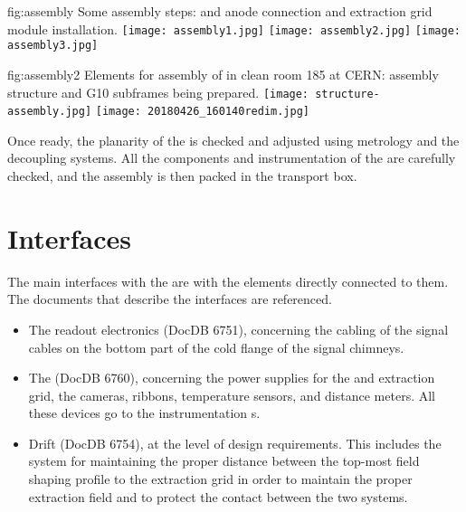 \begin{dunefigure}{fig:assembly}
{Some assembly steps:  and anode connection and extraction grid module installation.}
\texttt{[image: assembly1.jpg]}
\texttt{[image: assembly2.jpg]}
\texttt{[image: assembly3.jpg]}
\end{dunefigure}

\begin{dunefigure}{fig:assembly2}
{Elements for assembly of   in clean room 185 at CERN: assembly structure and G10 subframes being prepared.}
\texttt{[image: structure-assembly.jpg]}
\texttt{[image: 20180426\_160140redim.jpg]}
\end{dunefigure}
Once ready, the planarity of the  is checked and adjusted using metrology and the decoupling systems.
All the components and instrumentation of the  are carefully checked, and the assembly is then packed in the transport box.



\section{Interfaces}
\label{sec:fddp-crp-intfc}

The main interfaces with the  are with the elements directly connected to them. The documents that describe the interfaces are referenced.
\begin{itemize}
\item The readout electronics  (DocDB 6751), concerning the cabling of the signal cables on the bottom part of the cold 
flange of the signal chimneys.  
\item The  (DocDB 6760),  concerning the power supplies for the  and extraction grid, the cameras,  ribbons, temperature sensors, and distance meters. All these devices go to the  instrumentation \fdth{}s. 

\item Drift  (DocDB 6754), at the level of design requirements. This includes the system for maintaining the proper distance between the top-most field shaping profile to the extraction grid in order to maintain the proper extraction field and to protect the contact between the two systems.
\end{itemize}

